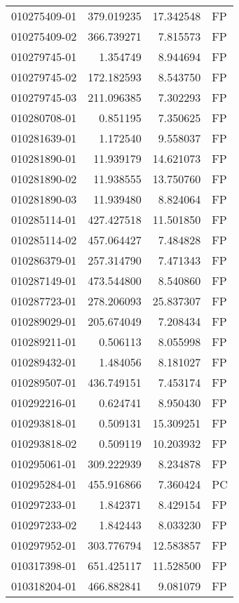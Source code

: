 \begin{tabular}{lrrl}
010275409-01 &  379.019235 &    17.342548 &   FP \\
010275409-02 &  366.739271 &     7.815573 &   FP \\
010279745-01 &    1.354749 &     8.944694 &   FP \\
010279745-02 &  172.182593 &     8.543750 &   FP \\
010279745-03 &  211.096385 &     7.302293 &   FP \\
010280708-01 &    0.851195 &     7.350625 &   FP \\
010281639-01 &    1.172540 &     9.558037 &   FP \\
010281890-01 &   11.939179 &    14.621073 &   FP \\
010281890-02 &   11.938555 &    13.750760 &   FP \\
010281890-03 &   11.939480 &     8.824064 &   FP \\
010285114-01 &  427.427518 &    11.501850 &   FP \\
010285114-02 &  457.064427 &     7.484828 &   FP \\
010286379-01 &  257.314790 &     7.471343 &   FP \\
010287149-01 &  473.544800 &     8.540860 &   FP \\
010287723-01 &  278.206093 &    25.837307 &   FP \\
010289029-01 &  205.674049 &     7.208434 &   FP \\
010289211-01 &    0.506113 &     8.055998 &   FP \\
010289432-01 &    1.484056 &     8.181027 &   FP \\
010289507-01 &  436.749151 &     7.453174 &   FP \\
010292216-01 &    0.624741 &     8.950430 &   FP \\
010293818-01 &    0.509131 &    15.309251 &   FP \\
010293818-02 &    0.509119 &    10.203932 &   FP \\
010295061-01 &  309.222939 &     8.234878 &   FP \\
010295284-01 &  455.916866 &     7.360424 &   PC \\
010297233-01 &    1.842371 &     8.429154 &   FP \\
010297233-02 &    1.842443 &     8.033230 &   FP \\
010297952-01 &  303.776794 &    12.583857 &   FP \\
010317398-01 &  651.425117 &    11.528500 &   FP \\
010318204-01 &  466.882841 &     9.081079 &   FP \\

\end{tabular}
